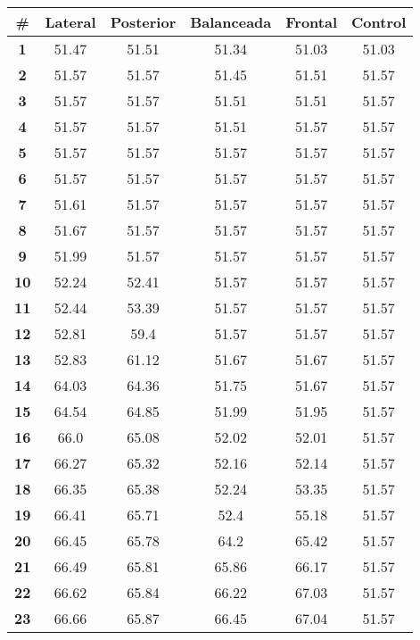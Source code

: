 \begin{longtable}{|c|c|c|c|c|c|}
    \hline
    \rowcolor[HTML]{ECF4FF} 
    \textbf{\#} & \textbf{Lateral} & \textbf{Posterior} & \textbf{Balanceada} & \textbf{Frontal} & \textbf{Control} \\ \hline
    \endhead
    \textbf{1} & 51.47 & 51.51 & 51.34 & 51.03 & 51.03 \\ \hline 
\textbf{2} & 51.57 & 51.57 & 51.45 & 51.51 & 51.57 \\ \hline 
\textbf{3} & 51.57 & 51.57 & 51.51 & 51.51 & 51.57 \\ \hline 
\textbf{4} & 51.57 & 51.57 & 51.51 & 51.57 & 51.57 \\ \hline 
\textbf{5} & 51.57 & 51.57 & 51.57 & 51.57 & 51.57 \\ \hline 
\textbf{6} & 51.57 & 51.57 & 51.57 & 51.57 & 51.57 \\ \hline 
\textbf{7} & 51.61 & 51.57 & 51.57 & 51.57 & 51.57 \\ \hline 
\textbf{8} & 51.67 & 51.57 & 51.57 & 51.57 & 51.57 \\ \hline 
\textbf{9} & 51.99 & 51.57 & 51.57 & 51.57 & 51.57 \\ \hline 
\textbf{10} & 52.24 & 52.41 & 51.57 & 51.57 & 51.57 \\ \hline 
\textbf{11} & 52.44 & 53.39 & 51.57 & 51.57 & 51.57 \\ \hline 
\textbf{12} & 52.81 & 59.4 & 51.57 & 51.57 & 51.57 \\ \hline 
\textbf{13} & 52.83 & 61.12 & 51.67 & 51.67 & 51.57 \\ \hline 
\textbf{14} & 64.03 & 64.36 & 51.75 & 51.67 & 51.57 \\ \hline 
\textbf{15} & 64.54 & 64.85 & 51.99 & 51.95 & 51.57 \\ \hline 
\textbf{16} & 66.0 & 65.08 & 52.02 & 52.01 & 51.57 \\ \hline 
\textbf{17} & 66.27 & 65.32 & 52.16 & 52.14 & 51.57 \\ \hline 
\textbf{18} & 66.35 & 65.38 & 52.24 & 53.35 & 51.57 \\ \hline 
\textbf{19} & 66.41 & 65.71 & 52.4 & 55.18 & 51.57 \\ \hline 
\textbf{20} & 66.45 & 65.78 & 64.2 & 65.42 & 51.57 \\ \hline 
\textbf{21} & 66.49 & 65.81 & 65.86 & 66.17 & 51.57 \\ \hline 
\textbf{22} & 66.62 & 65.84 & 66.22 & 67.03 & 51.57 \\ \hline 
\textbf{23} & 66.66 & 65.87 & 66.45 & 67.04 & 51.57 \\ \hline 

\end{longtable}
